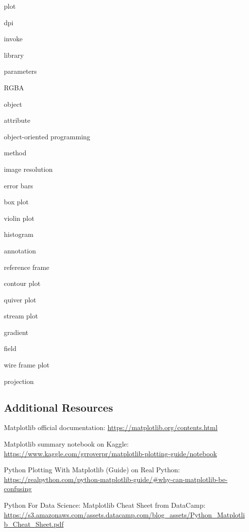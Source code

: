 \documentclass{book}
\newenvironment{key_terms}{\begin{multicols}{3}}{\end{multicols}} %
\begin{document}
    
        \begin{key_terms}
        plot

dpi

invoke

library

parameters

RGBA

object

attribute

object-oriented programming

method

image resolution

error bars

box plot

violin plot

histogram

annotation

reference frame

contour plot

quiver plot

stream plot

gradient

field

wire frame plot

projection
        \end{key_terms}

    




    
        \hypertarget{additional-resources}{%
\subsection{Additional Resources}\label{additional-resources}}
    




    
        Matplotlib official documentation:
\url{https://matplotlib.org/contents.html}

Matplotlib summary notebook on Kaggle:
\url{https://www.kaggle.com/grroverpr/matplotlib-plotting-guide/notebook}

Python Plotting With Matplotlib (Guide) on Real Python:
\url{https://realpython.com/python-matplotlib-guide/\#why-can-matplotlib-be-confusing}

Python For Data Science: Matplotlib Cheat Sheet from DataCamp:
\url{https://s3.amazonaws.com/assets.datacamp.com/blog_assets/Python_Matplotlib_Cheat_Sheet.pdf}
    
\end{document}

